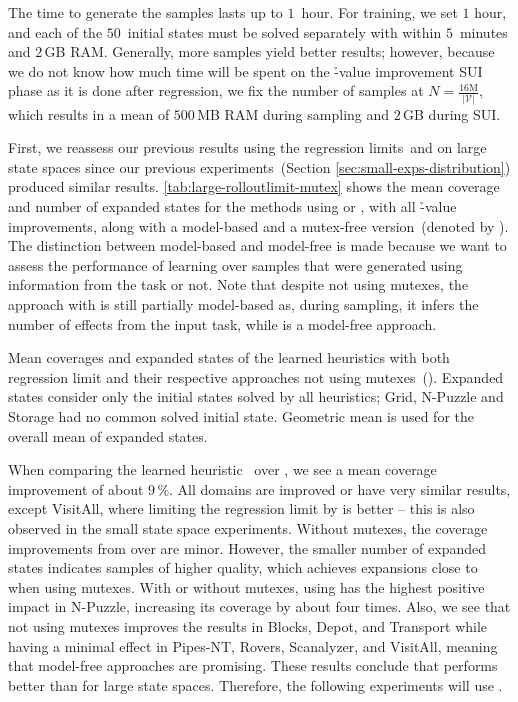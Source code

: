 The time to generate the samples lasts up to $1$~hour. For training, we set $1$ hour, and each of the $50$~initial states must be solved separately with \gbfs within $5$~minutes and $2$\,GB RAM. Generally, more samples yield better results; however, because we do not know how much time will be spent on the \h-value improvement SUI phase as it is done after regression, we fix the number of samples at $N = \frac{16\text{M}}{|\mathcal{V}|}$, which results in a mean of $500$\,MB RAM during sampling and $2$\,GB during SUI.

First, we reassess our previous results using the regression limits~\rlfacts and \rlmeanfx on large state spaces since our previous experiments~(Section \ref{sec:small-exps-distribution}) produced similar results. \cref{tab:large-rolloutlimit-mutex} shows the mean coverage and number of expanded states for the methods using \rlfacts or \rlmeanfx, with all \h-value improvements, along with a model-based and a mutex-free version~(denoted by \hnnnomutex). The distinction between model-based and model-free is made because we want to assess the performance of learning over samples that were generated using information from the task or not. Note that despite not using mutexes, the approach with \hnnnomutexl{\rlmeanfx} is still partially model-based as, during sampling, it infers the number of effects from the input task, while \hnnnomutexl{\rlfacts} is a model-free approach.

\begin{table}[ht]
    \caption[Results of the learned heuristics with and without mutexes.]{Mean coverages and expanded states of the learned heuristics with both regression limit and their respective approaches not using mutexes~(\hnnnomutex). Expanded states consider only the initial states solved by all heuristics; Grid, N-Puzzle and Storage had no common solved initial state. Geometric mean is used for the overall mean of expanded states.}
    \label{tab:large-rolloutlimit-mutex}
    \addmargin
    \centering
    
\end{table}

When comparing the learned heuristic~\hnnl{\rlmeanfx} over \hnnl{\rlfacts}, we see a mean coverage improvement of about $9\,\%$. All domains are improved or have very similar results, except VisitAll, where limiting the regression limit by \rlfacts is better -- this is also observed in the small state space experiments. Without mutexes, the coverage improvements from \hnnnomutexl{\rlmeanfx} over \hnnnomutexl{\rlfacts} are minor. However, the smaller number of expanded states indicates samples of higher quality, which achieves expansions close to when using mutexes. With or without mutexes, using \rlmeanfx has the highest positive impact in N-Puzzle, increasing its coverage by about four times. Also, we see that not using mutexes improves the results in Blocks, Depot, and Transport while having a minimal effect in Pipes-NT, Rovers, Scanalyzer, and VisitAll, meaning that model-free approaches are promising. These results conclude that \rlmeanfx performs better than \rlfacts for large state spaces. Therefore, the following experiments will use \rlmeanfx.

